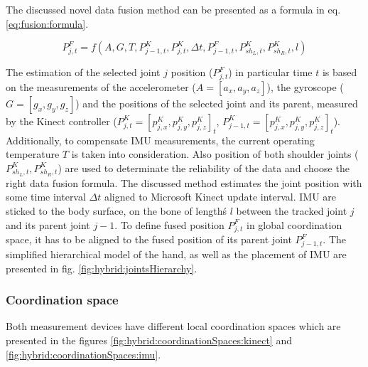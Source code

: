 \documentclass[sensors,article,submit,moreauthors,pdftex,10pt,a4paper]{mdpi}
\begin{document}
The discussed novel data fusion method can be presented as a formula in eq. \ref{eq:fusion:formula}.
		
\begin{equation}
	P^F_{j,t} = f(A,G,T,P_{j-1,t}^K,P_{j,t}^K,\Delta t, P^F_{j-1,t}, P^K_{sh_L,t},P^K_{sh_R,t},l) 
	\label{eq:fusion:formula}
\end{equation}
		
The estimation of the selected joint $j$ position ($P^F_{j,t}$) in particular time $t$ is based on the measurements of the accelerometer ($A=[a_x,a_y,a_z]$), the gyroscope ($G=[g_x,g_y,g_z]$) and the positions of the selected joint and its parent, measured by the Kinect controller ($P^K_{j,t} = [p^K_{j,x}, p^K_{j,y}, p^K_{j,z}]_t$, $P^K_{j-1,t} = [p^K_{j,x}, p^K_{j,y}, p^K_{j,z}]_t$). Additionally, to compensate IMU measurements, the current operating temperature $T$ is taken into consideration. Also position of both shoulder joints ($ P^K_{sh_L,t},P^K_{sh_R,t}$) are used to determinate the reliability of the data and choose the right data fusion formula. The discussed method estimates the joint position with some time interval $\Delta t$ aligned to Microsoft Kinect update interval. IMU are sticked to the body surface, on the bone of lengthś $l$ between the tracked joint $j$ and its parent joint $j-1$. To define fused position $P^F_{j,t}$ in global coordination space, it has to be aligned to the fused position of its parent joint $P^F_{j-1,t}$. The simplified hierarchical model of the hand, as well as the placement of IMU are presented in fig. \ref{fig:hybrid:jointsHierarchy}.	
		
\subsubsection{Coordination space}
Both measurement devices have different local coordination spaces which are presented in the figures \ref{fig:hybrid:coordinationSpaces:kinect} and \ref{fig:hybrid:coordinationSpaces:imu}.
	
\end{document}
